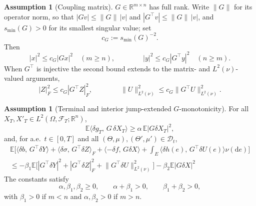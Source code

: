 \documentclass[preprint,12pt]{elsarticle}
\newcommand{\R}{\mathbb{R}}
\newcommand{\E}{\mathbb{E}}
\newcommand{\F}{\mathcal{F}}
\newcommand{\diff}{\mathrm{d}}
\newcommand{\inner}[2]{\langle #1,\,#2\rangle}
\newcommand{\Lnu}{L^2(\nu)}
\newcommand{\Gstar}{G^{\!\top}}
\newcommand{\Lnorm}[1]{\lVert #1\rVert_{\Lnu}}
\numberwithin{equation}{section}
\theoremstyle{plain}
\theoremstyle{definition}
\newtheorem{assumption}[theorem]{Assumption}
\theoremstyle{\PaperRemarkStyle}
\begin{document}
\begin{assumption}[Coupling matrix]\label{ass:G}
$G\in\R^{m\times n}$ has full rank. Write $\|G\|$ for its operator norm, so that
$|Gv|\le\|G\|\,|v|$ and $|\Gstar v|\le\|G\|\,|v|$, and $s_{\min}(G)>0$ for its
smallest singular value; set
\[
c_G:=s_{\min}(G)^{-2} .
\]
Then
\[
|x|^2\le c_G|Gx|^2\quad(m\ge n),
\qquad\qquad
|y|^2\le c_G|\Gstar y|^2\quad(n\ge m).
\]
When $\Gstar$ is injective the second bound extends to the matrix- and $\Lnu$-valued
arguments,
\[
|Z|_F^2\le c_G|\Gstar Z|_F^2,
\qquad\qquad
\Lnorm{U}^2\le c_G\Lnorm{\Gstar U}^2 .
\]
\end{assumption}
\begin{assumption}[Terminal and interior jump-extended $G$-monotonicity]\label{ass:mono}
For all $X_T,X'_T\in L^2(\Omega,\F_T;\R^n)$,
\[
\E\inner{\delta g_T}{G\,\delta X_T}\ge\alpha\,\E|G\delta X_T|^2,
\]
and, for a.e.\ $t\in[0,T]$ and all $(\Theta,\mu),(\Theta',\mu')\in\mathcal D_t$,
\begin{multline}\label{eq:mono}
\E\!\Big[\inner{\delta b}{\Gstar\delta Y}+\inner{\delta\sigma}{\Gstar\delta Z}_F
+\inner{-\delta f}{G\delta X}+\!\int_E\!\inner{\delta h(e)}{\Gstar\delta U(e)}\nu(\diff e)\Big]\\
\le-\beta_1\E\big[|\Gstar\delta Y|^2+|\Gstar\delta Z|_F^2+\Lnorm{\Gstar\delta U}^2\big]-\beta_2\E|G\delta X|^2
\end{multline}
The constants satisfy
\[
\alpha,\beta_1,\beta_2\ge0,\qquad \alpha+\beta_1>0,\qquad \beta_1+\beta_2>0,
\]
with $\beta_1>0$ if $m<n$ and $\alpha,\beta_2>0$ if $m>n$.
\end{assumption}
\end{document}
